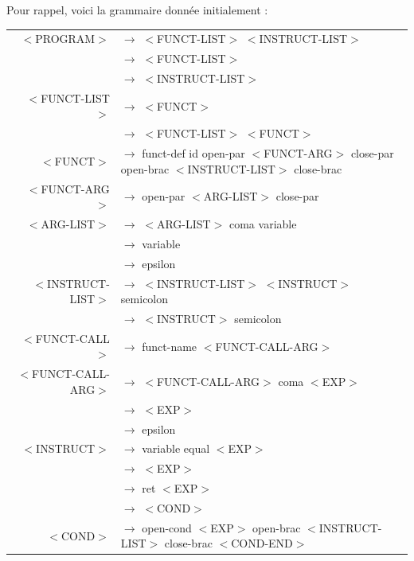 \documentclass[a4paper,10pt]{article}
\begin{document}
	Pour rappel, voici la grammaire donnée initialement :\\
	
	
\hspace{-3.0cm}\begin{tabular}{rl}
$<$PROGRAM$>$		& $\rightarrow$ $<$FUNCT-LIST$>$ $<$INSTRUCT-LIST$>$\\
					& $\rightarrow$ $<$FUNCT-LIST$>$\\
					& $\rightarrow$ $<$INSTRUCT-LIST$>$\\
					
					
$<$FUNCT-LIST$>$	& $\rightarrow$ $<$FUNCT$>$ \\
					& $\rightarrow$ $<$FUNCT-LIST$>$ $<$FUNCT$>$\\
					
$<$FUNCT$>$			& $\rightarrow$ funct-def id open-par $<$FUNCT-ARG$>$ close-par open-brac $<$INSTRUCT-LIST$>$ close-brac \\

					
$<$FUNCT-ARG$>$		& $\rightarrow$ open-par $<$ARG-LIST$>$ close-par\\

$<$ARG-LIST$>$		& $\rightarrow$ $<$ARG-LIST$>$ coma variable \\ 
					& $\rightarrow$ variable\\ 
					& $\rightarrow$ epsilon \\

$<$INSTRUCT-LIST$>$	& $\rightarrow$ $<$INSTRUCT-LIST$>$ $<$INSTRUCT$>$ semicolon\\
					& $\rightarrow$ $<$INSTRUCT$>$ semicolon\\
					
$<$FUNCT-CALL$>$	& $\rightarrow$ funct-name $<$FUNCT-CALL-ARG$>$\\

$<$FUNCT-CALL-ARG$>$& $\rightarrow$ $<$FUNCT-CALL-ARG$>$ coma $<$EXP$>$\\
					& $\rightarrow$ $<$EXP$>$\\
					& $\rightarrow$ epsilon\\

$<$INSTRUCT$>$		& $\rightarrow$ variable equal $<$EXP$>$\\
					& $\rightarrow$ $<$EXP$>$\\
					& $\rightarrow$ ret $<$EXP$>$\\
					& $\rightarrow$ $<$COND$>$\\
					
$<$COND$>$			& $\rightarrow$ open-cond $<$EXP$>$ open-brac $<$INSTRUCT-LIST$>$ close-brac $<$COND-END$>$\\




\end{tabular}
\end{document}
